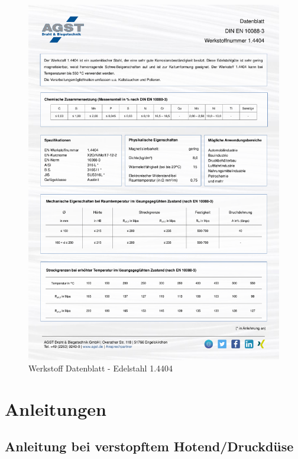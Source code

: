   \begin{figure}[ht]
    \centering
    \includegraphics[width=1\textwidth]{bilder/Werkstoff_Datenblatt_1.4404.pdf}
    \caption[Werkstoff Datenblatt - Edelstahl 1.4404]{Werkstoff Datenblatt - Edelstahl 1.4404 \autocite{AGSTSteel:1.4404}}
    \label{Datenblatt1.4404}
  \end{figure}
  \FloatBarrier
  

\section{Anleitungen}
\label{Anleitungen}
\subsection*{Anleitung bei verstopftem Hotend/Druckdüse}

